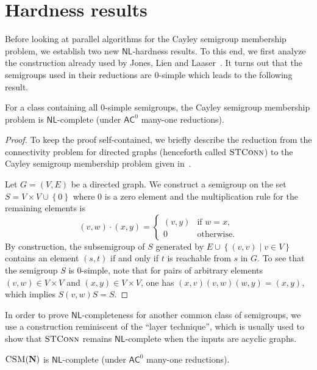 \documentclass{toc}
\newcommand{\union}{\mathbin{\cup}}
\newcommand{\set}[2]{\ensuremath{\left\{#1 \mid #2\right\}}}
\newcommand{\os}[1]{\ensuremath{\left\{#1\right\}}}
\newcommand{\AC}{\ensuremath{\mathsf{AC}}}
\newcommand{\NL}{\ensuremath{\mathsf{NL}}}
\newcommand{\vNil}{\mathbf{N}}
\newcommand{\CSM}{\ensuremath{\textsc{CSM}}}
\newcommand{\STCONN}{\ensuremath{\textsc{STConn}}}
\newcommand{\SCSM}{Cayley semigroup membership}
\newcommand{\SCSMP}{{\SCSM} problem}
\begin{document}
\section{Hardness results}

Before looking at parallel algorithms for the {\SCSMP}, we establish two new
$\NL$-hardness results.
%
To this end, we first analyze the construction already used by Jones, Lien and
Laaser~\cite{JonesLL76}.
%
It turns out that the semigroups used in their reductions are $0$-simple which
leads to the following result.

\begin{theorem}
  For a class containing all $0$-simple semigroups, the {\SCSMP} is
  $\NL$-complete (under $\AC^0$ many-one reductions).
  \label{thm:0-simple}
\end{theorem}

\begin{proof}
  To keep the proof self-contained, we briefly describe the reduction from
  the connectivity problem for directed graphs (henceforth called $\STCONN$) to
  the {\SCSMP} given in~\cite{JonesLL76}.

  Let $G = (V, E)$ be a directed graph.
  We construct a semigroup on the set $S = V \times V \union \os{0}$ where $0$
  is a zero element and the multiplication rule for the remaining elements is
  \begin{equation*}
    (v, w) \cdot (x, y) =
    \begin{cases}
      (v, y) & \text{if $w = x$}, \\
      0 & \text{otherwise}.
    \end{cases}
  \end{equation*}
  By construction, the subsemigroup of $S$ generated by $E \union \set{(v,
  v)}{v \in V}$ contains an element $(s, t)$ if and only if $t$ is reachable
  from $s$ in $G$.
  To see that the semigroup $S$ is $0$-simple, note that for pairs of arbitrary
  elements $(v, w) \in V \times V$ and $(x, y) \in V \times V$, one has $(x, v)
  (v, w) (w, y) = (x, y)$, which implies $S (v, w) S = S$.
\end{proof}

In order to prove $\NL$-completeness for another common class of semigroups, we
use a construction reminiscent of the ``layer technique'', which is usually
used to show that $\STCONN$ remains $\NL$-complete when the inputs are acyclic
graphs.

\begin{theorem}
  $\CSM(\vNil)$ is $\NL$-complete (under $\AC^0$ many-one reductions).
  \label{thm:nil}
\end{theorem}
\end{document}
